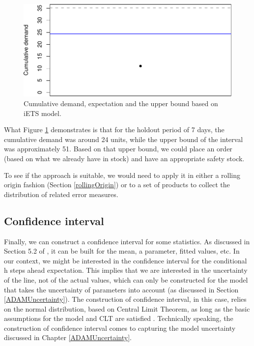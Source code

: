 \documentclass[
]{book}
\theoremstyle{definition}
\theoremstyle{definition}
\theoremstyle{definition}
\theoremstyle{definition}
\theoremstyle{remark}
\begin{document}
\begin{figure}
\centering
\includegraphics{Svetunkov--2022----ADAM_files/figure-latex/adamModeliETSCumulative-1.pdf}
\caption{\label{fig:adamModeliETSCumulative}Cumulative demand, expectation and the upper bound based on iETS model.}
\end{figure}

What Figure \ref{fig:adamModeliETSCumulative} demonstrates is that for the holdout period of 7 days, the cumulative demand was around 24 units, while the upper bound of the interval was approximately 51. Based on that upper bound, we could place an order (based on what we already have in stock) and have an appropriate safety stock.

To see if the approach is suitable, we would need to apply it in either a rolling origin fashion (Section \ref{rollingOrigin}) or to a set of products to collect the distribution of related error measures.

\hypertarget{confidence-interval}{%
\subsection{Confidence interval}\label{confidence-interval}}

Finally, we can construct a confidence interval for some statistics. As discussed in Section 5.2 of \citet{SvetunkovSBA}, it can be built for the mean, a parameter, fitted values, etc. In our context, we might be interested in the confidence interval for the conditional h steps ahead expectation. This implies that we are interested in the uncertainty of the line, not of the actual values, which can only be constructed for the model that takes the uncertainty of parameters into account (as discussed in Section \ref{ADAMUncertainty}). The construction of confidence interval, in this case, relies on the normal distribution, based on Central Limit Theorem, as long as the basic assumptions for the model and CLT are satisfied \citep[see Section 4.2 and Chapter 12 of][]{SvetunkovSBA}. Technically speaking, the construction of confidence interval comes to capturing the model uncertainty discussed in Chapter \ref{ADAMUncertainty}.
\end{document}

